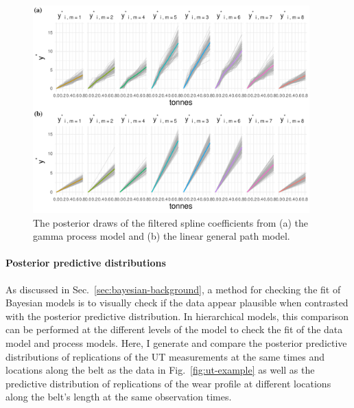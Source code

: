 \begin{figure}[tbp]
  \centering
  \includegraphics[width=0.95\textwidth]{figures/ch-6/post_y_belt_wear.pdf}
  \caption{The posterior draws of the filtered spline coefficients from (a) the gamma process model and (b) the linear general path model.}
  \label{fig:y-post-beltwear}
\end{figure}

\paragraph{Posterior predictive distributions}

As discussed in Sec.~\ref{sec:bayesian-background}, a method for checking the fit of Bayesian models is to visually check if the data appear plausible when contrasted with the posterior predictive distribution. In hierarchical models, this comparison can be performed at the different levels of the model to check the fit of the data model and process models. Here, I generate and compare the posterior predictive distributions of replications of the UT measurements at the same times and locations along the belt as the data in Fig.~\ref{fig:ut-example} as well as the predictive distribution of replications of the wear profile at different locations along the belt's length at the same observation times.

